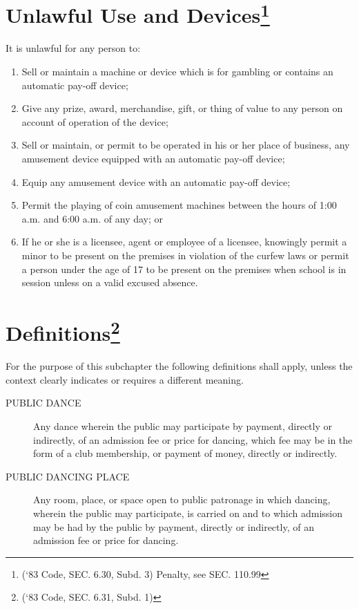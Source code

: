 \section{Unlawful Use and Devices\footnote{(‘83 Code, SEC. 6.30, Subd. 3)  Penalty, see SEC. 110.99}}
It is unlawful for any person to:
\begin{enumerate}[{\indent}A)]
    \item Sell or maintain a machine or device which is for gambling or contains an automatic pay-off device; 
    \item Give any prize, award, merchandise, gift, or thing of value to any person on account of operation of the device; 
    \item Sell or maintain, or permit to be operated in his or her place of business, any amusement device equipped with an automatic pay-off device; 
    \item Equip any amusement device with an automatic pay-off device; 
    \item Permit the playing of coin amusement machines between the hours of 1:00 a.m. and 6:00 a.m. of any day; or 
    \item If he or she is a licensee, agent or employee of a licensee, knowingly permit a minor to be present on the premises in violation of the curfew laws or permit a person under the age of 17 to be present on the premises when school is in session unless on a valid excused absence. 
\end{enumerate}


\setcounter{section}{14}
\section{Definitions\footnote{(‘83 Code, SEC. 6.31, Subd. 1)}}
For the purpose of this subchapter the following definitions shall apply, unless the context clearly indicates or requires a different meaning.
\begin{description}
    \item[PUBLIC DANCE] Any dance wherein the public may participate by payment, directly or indirectly, of an admission fee or price for dancing, which fee may be in the form of a club membership, or payment of money, directly or indirectly.
    \item[PUBLIC DANCING PLACE] Any room, place, or space open to public patronage in which dancing, wherein the public may participate, is carried on and to which admission may be had by the public by payment, directly or indirectly, of an admission fee or price for dancing.
\end{description}

